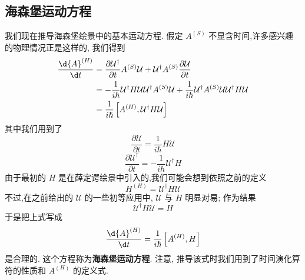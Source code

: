 \subsection{海森堡运动方程}
我们现在推导海森堡绘景中的基本运动方程. 假定 ${A}^{\left( S\right) }$ 不显含时间,许多感兴趣的物理情况正是这样的, 我们得到
\begin{equation}
	\begin{aligned}
		\frac{\d{A}^{\left( H\right) }}{\d t} &= \frac{\partial \mathcal{U}^{ \dagger }}{\partial t}{A}^{\left( S\right) }\mathcal{U} + \mathcal{U}^{ \dagger }{A}^{\left( S\right) }\frac{\partial\mathcal{U}}{\partial t}\\
		&= - \frac{1}{i\hbar }\mathcal{U}^{ \dagger }H\mathcal{U}\mathcal{U}^{ \dagger }{A}^{\left( S\right) }\mathcal{U} + \frac{1}{i\hbar }\mathcal{U}^{ \dagger }{A}^{\left( S\right) }\mathcal{U}\mathcal{U}^{ \dagger }{H\mathcal{U}}\\
		&= \frac{1}{i\hbar }\left\lbrack {{A}^{\left( H\right) },\mathcal{U}^{ \dagger }{H\mathcal{U}}}\right\rbrack
	\end{aligned}
\end{equation}
其中我们用到了
\begin{equation}
	\frac{\partial \mathcal{U}}{\partial t} = \frac{1}{i\hbar }{H\mathcal{U}}
\end{equation}
\begin{equation}
	\frac{\partial\mathcal{U}^\dagger}{\partial t} = - \frac{1}{ih}{\mathcal{U}}^\dagger H
\end{equation}
由于最初的 $H$ 是在薛定谔绘景中引入的,我们可能会想到依照之前的定义
\begin{equation}
	{H}^{\left( H\right) } = \mathcal{U}^\dagger{H\mathcal{U}}
\end{equation}
不过,在之前给出的 $\mathcal{U}$ 的一些初等应用中, $\mathcal{U}$ 与 $H$ 明显对易; 作为结果
\begin{equation}
	\mathcal{U}^\dagger{H\mathcal{U}} = H
\end{equation}
于是把上式写成
\begin{equation}\label{2.94}
	\frac{\d{A}^{\left( H\right) }}{\d t} = \frac{1}{i\hbar }\left\lbrack {{A}^{\left( H\right) }, H}\right\rbrack
\end{equation}
是合理的. 这个方程称为\textbf{海森堡运动方程}. 注意, 推导该式时我们用到了时间演化算符的性质和 ${A}^{\left( H\right) }$ 的定义式.

